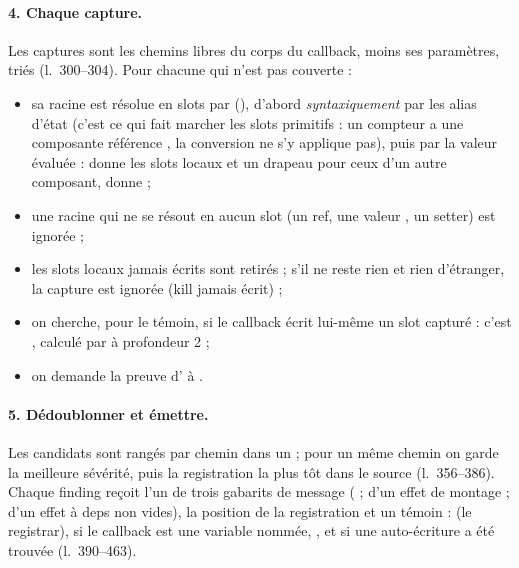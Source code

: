 \paragraph{4. Chaque capture.} Les captures sont les chemins libres du corps du callback, moins ses paramètres, triés (l.~300--304). Pour chacune qui n'est pas couverte :
\begin{itemize}
  \item sa racine est résolue en slots par  (), d'abord \emph{syntaxiquement} par les alias d'état (c'est ce qui fait marcher les slots primitifs : un compteur a une composante référence , la conversion  ne s'y applique pas), puis par la valeur évaluée :  donne les slots locaux et un drapeau  pour ceux d'un autre composant,  donne  ;
  \item une racine qui ne se résout en aucun slot (un ref, une valeur , un setter) est ignorée ;
  \item les slots locaux jamais écrits sont retirés ; s'il ne reste rien et rien d'étranger, la capture est ignorée (kill \og jamais écrit\fg{}) ;
  \item on cherche, pour le témoin, si le callback écrit lui-même un slot capturé : c'est , calculé par  à profondeur 2 ;
  \item on demande la preuve d'\Error{} à .
\end{itemize}


\paragraph{5. Dédoublonner et émettre.} Les candidats sont rangés par chemin dans un  ; pour un même chemin on garde la meilleure sévérité, puis la registration la plus tôt dans le source (l.~356--386). Chaque finding reçoit l'un de trois gabarits de message (\Error{} ; \Warning{} d'un effet de montage ; \Warning{} d'un effet à deps non vides), la position de la registration et un témoin :  (le registrar),  si le callback est une variable nommée, , et  si une auto-écriture a été trouvée (l.~390--463).

